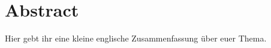 \thispagestyle{empty}
\chapter*{Abstract}
Hier gebt ihr eine kleine englische Zusammenfassung über euer Thema.